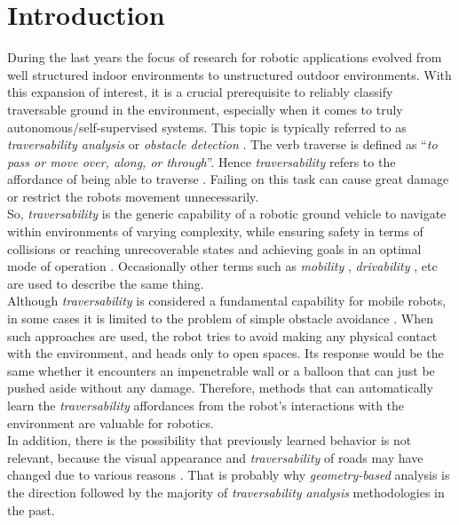 \documentclass[12pt,a4paper]{report}
\newcommand{\defn}[1]{\enquote{\textit{#1}}}
\newcommand{\term}{\textit}
\begin{document}
	{
		\hypersetup{linkcolor=black}
		\tableofcontents
	}
	
	\chapter{Introduction}
	\label{sec:intro}
	
	During the last years the focus of research for robotic applications evolved 
	from well structured indoor environments to unstructured outdoor environments. 
	With this expansion of interest, it is a crucial prerequisite to reliably 
	classify traversable ground in the environment, especially when it comes to 
	truly autonomous/self-supervised systems. This topic is typically referred to as 
	\term{traversability analysis} or \term{obstacle detection} \cite{Suger}. The 
	verb traverse is defined as \defn{to pass or move over, along, or through}. 
	Hence \term{traversability} refers to the affordance of being able to traverse 
	\cite{Ugur}. Failing on this task can cause great damage or restrict the robots 
	movement unnecessarily.
	\\
	
	So, \term{traversability} is the generic capability of a robotic ground 
	vehicle to navigate within environments of varying complexity, while ensuring 
	safety in terms of collisions or reaching unrecoverable states and achieving 
	goals in an optimal mode of operation \cite{Papadakis}. Occasionally other 
	terms such as \term{mobility} \cite{Lalonde}, \term{drivability} \cite{Droeschel}, 
	etc are used to describe the same thing.
	\\
	
	Although \term{traversability} is considered a fundamental capability for mobile 
	robots, in some cases it is limited to the problem of simple obstacle avoidance 
	\cite{Ugur}. When such approaches are used, the robot tries to avoid making any 
	physical contact with the environment, and heads only to open spaces. Its 
	response would be the same whether it encounters an impenetrable wall or a 
	balloon that can just be pushed aside without any damage. Therefore, methods 
	that can automatically learn the \term{traversability} affordances from the 
	robot’s interactions with the environment are valuable for robotics.
	\\
		
	In addition, there is the possibility that previously learned behavior is not 
	relevant, because the visual appearance and \term{traversability} of roads may 
	have changed due to various reasons \cite{Wigness}. That is probably why 
	\term{geometry-based} analysis is the direction followed by the majority of 
	\term{traversability analysis} methodologies in the past\cite{Papadakis}.
	\\
	
\end{document}
